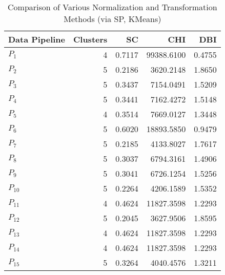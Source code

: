 \begin{table}[t]
\centering
\caption{Comparison of Various Normalization and Transformation Methods (via SP, KMeans)}
\label{tbl:Comparison_SP_KMeans_norm_tran}
\begin{tabular}{lrrrr}
\toprule
Data Pipeline &  Clusters &     SC &        CHI &    DBI \\
\midrule
      $P_{1}$ &         4 & 0.7117 & 99388.6100 & 0.4755 \\
      $P_{2}$ &         5 & 0.2186 &  3620.2148 & 1.8650 \\
      $P_{3}$ &         5 & 0.3437 &  7154.0491 & 1.5209 \\
      $P_{4}$ &         5 & 0.3441 &  7162.4272 & 1.5148 \\
      $P_{5}$ &         4 & 0.3514 &  7669.0127 & 1.3448 \\
      $P_{6}$ &         5 & 0.6020 & 18893.5850 & 0.9479 \\
      $P_{7}$ &         5 & 0.2185 &  4133.8027 & 1.7617 \\
      $P_{8}$ &         5 & 0.3037 &  6794.3161 & 1.4906 \\
      $P_{9}$ &         5 & 0.3041 &  6726.1254 & 1.5256 \\
     $P_{10}$ &         5 & 0.2264 &  4206.1589 & 1.5352 \\
     $P_{11}$ &         4 & 0.4624 & 11827.3598 & 1.2293 \\
     $P_{12}$ &         5 & 0.2045 &  3627.9506 & 1.8595 \\
     $P_{13}$ &         4 & 0.4624 & 11827.3598 & 1.2293 \\
     $P_{14}$ &         4 & 0.4624 & 11827.3598 & 1.2293 \\
     $P_{15}$ &         5 & 0.3264 &  4040.4576 & 1.3211 \\
\bottomrule
\end{tabular}
\end{table}
